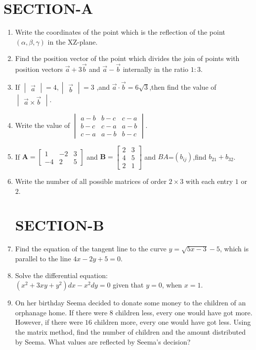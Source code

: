 \documentclass[12pt,-letter paper]{article}
\let\vec\mathbf{}
\let\vec\mathbf{}
\let\vec\mathbf{}
\providecommand{\mydet}[1]{\ensuremath{\begin{vmatrix}#1\end{vmatrix}}}
\providecommand{\myvec}[1]{\ensuremath{\begin{bmatrix}#1\end{bmatrix}}}
\providecommand{\brak}[1]{\ensuremath{\left(#1\right)}}
\begin{document}
\section*{\centering SECTION-A}
\begin{enumerate}
	\item Write the coordinates of the point which is the reflection of the point \brak {\alpha, \beta, \gamma} in the XZ-plane.
    
  \item  Find the position vector of the point which divides the join of points with position vectors $\overset{\rightarrow}{a}+3\overset{\rightarrow}{b}$ and $\overset{\rightarrow}{a}-\overset{\rightarrow}{b}$ internally in the ratio $1:3$.
    
  \item If $\mydet{\overset{\rightarrow}{a}} = 4 , \mydet{\overset{\rightarrow}{b}} = 3$ ,and $\overset{\rightarrow}{a} \cdot \overset{\rightarrow}{b}= 6\sqrt{3} $,then find the value of $\mydet{\overset{\rightarrow}{a} \times {\overset{\rightarrow}{b}}}$.
    
    \item Write the value of $\mydet{a-b&b-c&c-a\\b-c&c-a&a-b\\c-a&a-b&b-c}$.
    \item  If $ \vec{A} =\myvec{ 1 & -2 & 3 \\-4 & 2 & 5}$ and $ \vec{B}=\myvec{2&3\\4&5\\2&1}$ and  $BA$=$\brak{b_{ij}}$,find $b_{21}+b_{32}$.
    \item Write the number of all possible matrices of order $2 \times 3$  with each entry $1$ or $2$.

\section*{\centering SECTION-B}    
  \item  Find the equation of the tangent line to the curve $ y = \sqrt{5x - 3} - 5 $, which is parallel to the line $ 4x - 2y + 5 = 0 $.

   \item Solve the differential equation:\\$\brak{x^2+3xy+y^2}dx-x^2dy=0$ given that $y=0$, when $x=1$.

    \item On her birthday Seema decided to donate some money to the children of an orphanage home. If there were $8$ children less, every one would have got  more. However, if there were $16$ children more, every one would have got  less. Using the matrix method, find the number of children and the amount distributed by Seema. What values are reflected by Seema's decision?


\end{enumerate}
\end{document}
